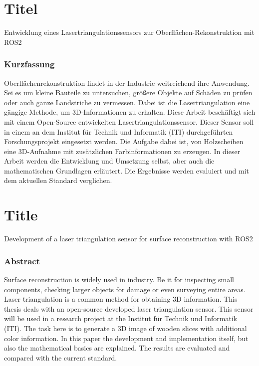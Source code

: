 \section*{Titel}
Entwicklung eines Lasertriangulationssensors zur Oberflächen-Rekonstruktion mit ROS2
\vfill
\subsubsection*{Kurzfassung}

Oberflächenrekonstruktion findet in der Industrie weitreichend ihre Anwendung. Sei es um kleine Bauteile zu untersuchen, größere Objekte auf Schäden zu prüfen oder auch ganze Landstriche zu vermessen. Dabei ist die Lasertriangulation eine gängige Methode, um 3D-Informationen zu erhalten. Diese Arbeit beschäftigt sich mit einem Open-Source entwickelten Lasertriangulationssensor. Dieser Sensor soll in einem an dem Institut für Technik und Informatik (ITI) durchgeführten Forschungsprojekt eingesetzt werden. Die Aufgabe dabei ist, von Holzscheiben eine 3D-Aufnahme mit zusätzlichen Farbinformationen zu erzeugen. In dieser Arbeit werden die Entwicklung und Umsetzung selbst, aber auch die mathematischen Grundlagen erläutert. Die Ergebnisse werden evaluiert und mit dem aktuellen Standard verglichen.

\section*{Title}
Development of a laser triangulation sensor for surface reconstruction with ROS2

\vfill
\subsubsection*{Abstract}

Surface reconstruction is widely used in industry. Be it for inspecting small components, checking larger objects for damage or even surveying entire areas. Laser triangulation is a common method for obtaining 3D information. This thesis deals with an open-source developed laser triangulation sensor. This sensor will be used in a research project at the Institut für Technik und Informatik (ITI). The task here is to generate a 3D image of wooden slices with additional color information. In this paper the development and implementation itself, but also the mathematical basics are explained. The results are evaluated and compared with the current standard.
